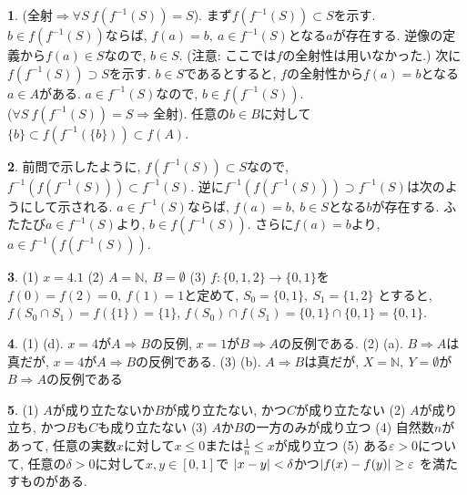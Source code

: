 \documentclass{amsart}
\theoremstyle{definition}
\newtheorem{ans}{}
\numberwithin{ans}{subsection}
\DeclarePairedDelimiter{\abs}{\lvert}{\rvert}
\begin{document}
\begin{ans}
  (全射$\Rightarrow \forall S\ f(f^{-1}(S)) = S$).
  まず$f(f^{-1}(S)) \subset S$を示す.
  $b \in f(f^{-1}(S))$ならば,
  $f(a) = b,\ a \in f^{-1}(S)$となる$a$が存在する.
  逆像の定義から$f(a) \in S$なので, $b \in S$.
  (注意: ここでは$f$の全射性は用いなかった.)
  次に$f(f^{-1}(S)) \supset S$を示す.
  $b \in S$であるとすると, $f$の全射性から$f(a) = b$となる$a \in A$がある.
  $a \in f^{-1}(S)$なので, $b \in f(f^{-1}(S))$.
  \\
  ($\forall S\ f(f^{-1}(S)) = S \Rightarrow$全射).
  任意の$b \in B$に対して$\{b\} \subset f(f^{-1}(\{b\})) \subset f(A)$.
\end{ans}

\begin{ans}
  前問で示したように, $f(f^{-1}(S)) \subset S$なので,
  $f^{-1}(f(f^{-1}(S))) \subset f^{-1}(S)$.
  逆に$f^{-1}(f(f^{-1}(S))) \supset f^{-1}(S)$は次のようにして示される.
  $a \in f^{-1}(S)$ならば, $f(a) = b,\ b \in S$となる$b$が存在する.
  ふたたび$a \in f^{-1}(S)$より, $b \in f(f^{-1}(S))$.
  さらに$f(a) = b$より, $a \in f^{-1}(f(f^{-1}(S)))$.
\end{ans}

\begin{ans}
  (1) $x = 4.1$
  (2) $A = \mathbb{N},\ B = \emptyset$
  (3) $f: \{0, 1, 2\} \rightarrow \{0, 1\}$を
  $f(0) = f(2) = 0,\ f(1) = 1$と定めて,
  $S_0 = \{0, 1\},\ S_1 = \{1, 2\}$
  とすると, $f(S_0 \cap S_1) = f(\{1\}) = \{1\}$,
  $f(S_0) \cap f(S_1) = \{0, 1\} \cap \{0, 1\} = \{0, 1\}$.
\end{ans}

\begin{ans}
  (1) (d).
  $x = 4$が$A \Rightarrow B$の反例,
  $x = 1$が$B \Rightarrow A$の反例である.
  (2) (a).
  $B \Rightarrow A$は真だが,
  $x = 4$が$A \Rightarrow B$の反例である.
  (3) (b). $A \Rightarrow B$は真だが,
  $X = \mathbb{N},\ Y = \emptyset$が$B \Rightarrow A$の反例である
\end{ans}

\begin{ans}
  (1) $A$が成り立たないか$B$が成り立たない, かつ$C$が成り立たない
  (2) $A$が成り立ち, かつ$B$も$C$も成り立たない
  (3) $A$か$B$の一方のみが成り立つ
  (4) 自然数$n$があって, 任意の実数$x$に対して$x \le 0$または$\frac{1}{n} \le x$が成り立つ
  (5) ある$\varepsilon > 0$について, 任意の$\delta > 0$に対して$x, y \in [0, 1]$で
  $\abs{x - y} < \delta$かつ$\abs{f(x) - f(y)} \ge \varepsilon$
  を満たすものがある.
\end{ans}
\end{document}
